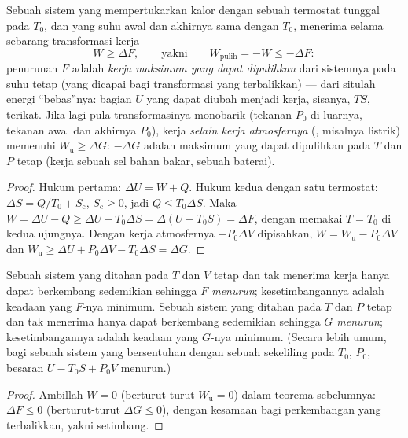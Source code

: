 \begin{theorem}\label{thm:b2:thermodynamic-potentials:monothermal}
Sebuah sistem yang mempertukarkan kalor dengan sebuah termostat tunggal pada $T_0$, dan yang
suhu awal dan akhirnya sama dengan $T_0$, menerima selama sebarang
transformasi kerja
\[
W \ge \Delta F , \qquad\text{yakni}\qquad W_{\text{pulih}} = -W \le -\Delta F :
\]
penurunan $F$ adalah \emph{kerja maksimum yang dapat dipulihkan} dari
sistemnya pada suhu tetap (yang dicapai bagi transformasi yang terbalikkan) ---
dari situlah energi ``bebas''nya: bagian $U$ yang dapat diubah menjadi kerja,
sisanya, $TS$, terikat. Jika lagi pula transformasinya monobarik
(tekanan $P_0$ di luarnya, tekanan awal dan akhirnya $P_0$), kerja
\emph{selain kerja atmosfernya} (, misalnya listrik)
memenuhi $W_{\text{u}} \ge \Delta G$: $-\Delta G$ adalah  maksimum
yang dapat dipulihkan pada $T$ dan $P$ tetap (kerja sebuah sel bahan bakar, sebuah
baterai).
\end{theorem}

\begin{proof}
Hukum pertama: $\Delta U = W + Q$. Hukum kedua dengan satu termostat: $\Delta S
= Q/T_0 + S_{\text{c}}$, $S_{\text{c}} \ge 0$, jadi $Q \le T_0\Delta S$. Maka
$W = \Delta U - Q \ge \Delta U - T_0\Delta S = \Delta(U - T_0S) = \Delta F$, dengan memakai
$T = T_0$ di kedua ujungnya. Dengan kerja atmosfernya $-P_0\Delta V$
dipisahkan, $W = W_{\text{u}} - P_0\Delta V$ dan $W_{\text{u}} \ge \Delta U + P_0
\Delta V - T_0\Delta S = \Delta G$.
\end{proof}

\begin{theorem}\label{thm:b2:thermodynamic-potentials:criteria}
Sebuah sistem yang ditahan pada $T$ dan $V$ tetap dan tak menerima kerja hanya dapat
berkembang sedemikian sehingga \emph{$F$ menurun}; kesetimbangannya adalah keadaan yang
$F$-nya minimum. Sebuah sistem yang ditahan pada $T$ dan $P$ tetap dan tak menerima  hanya dapat berkembang sedemikian sehingga \emph{$G$ menurun}; kesetimbangannya adalah
keadaan yang $G$-nya minimum. (Secara lebih umum, bagi sebuah sistem yang bersentuhan dengan
sebuah sekeliling pada $T_0$, $P_0$, besaran $U - T_0S + P_0V$ menurun.)
\end{theorem}

\begin{proof}
Ambillah $W = 0$ (berturut-turut $W_{\text{u}} = 0$) dalam teorema sebelumnya: $\Delta F
\le 0$ (berturut-turut $\Delta G \le 0$), dengan kesamaan bagi perkembangan yang terbalikkan, yakni
setimbang.
\end{proof}


